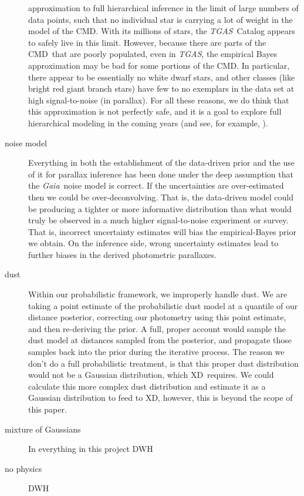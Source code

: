 \documentclass[modern]{aastex61}
\newcommand{\acronym}[1]{{\small{#1}}}
\newcommand{\project}[1]{\textsl{#1}}
\newcommand{\tgas}{\project{\acronym{TGAS}}}
\newcommand{\gaia}{\project{Gaia}}
\newcommand{\xd}{\acronym{XD}}
\newcommand{\cmd}{\acronym{CMD}}
\begin{document}
\begin{description}
  approximation to full hierarchical inference in the limit of large
  numbers of data points, such that no individual star is carrying a
  lot of weight in the model of the \cmd.  With its millions of stars,
  the \tgas\ Catalog appears to safely live in this limit.  However,
  because there are parts of the \cmd\ that are poorly populated, even
  in \tgas, the empirical Bayes approximation may be bad for some
  portions of the \cmd.  In particular, there appear to be essentially
  no white dwarf stars, and other classes (like bright red giant
  branch stars) have few to no exemplars in the data set at high
  signal-to-noise (in parallax).  For all these reasons, we do think
  that this approximation is not perfectly safe, and it is a goal to
  explore full hierarchical modeling in the coming years (and see, for
  example, \citealt{leistedtHogg2017}).
\item[noise model] Everything in both the establishment of the data-driven
  prior and the use of it for parallax inference has been done under the deep
  assumption that the \gaia\ noise model is correct. If the
  uncertainties are over-estimated then we could be over-deconvolving.
  That is, the data-driven model could be producing a tighter or more
  informative distribution than what would truly be observed in a much
  higher signal-to-noise experiment or survey. That is, incorrect uncertainty
  estimates will bias the empirical-Bayes prior we obtain. On the inference
  side, wrong uncertainty estimates lead to further biases in the derived photometric parallaxes.
\item[dust] Within our probabilistic framework, we improperly handle
  dust. We are taking a point estimate of the probabilistic dust model
  at a quantile of our distance posterior, correcting our photometry
  using this point estimate, and then re-deriving the prior. A full,
  proper account would sample the dust model at distances sampled from
  the posterior, and propagate those samples back into the prior
  during the iterative process. The reason we don't do a full
  probabilistic treatment, is that this proper dust distribution would
  not be a Gaussian distribution, which \xd\ requires. We could
  calculate this more complex dust distribution and estimate it as a
  Gaussian distribution to feed to \xd, however, this is beyond the
  scope of this paper.
\item[mixture of Gaussians] In everything in this project DWH
\item[no physics] DWH
\end{description}
\end{document}
